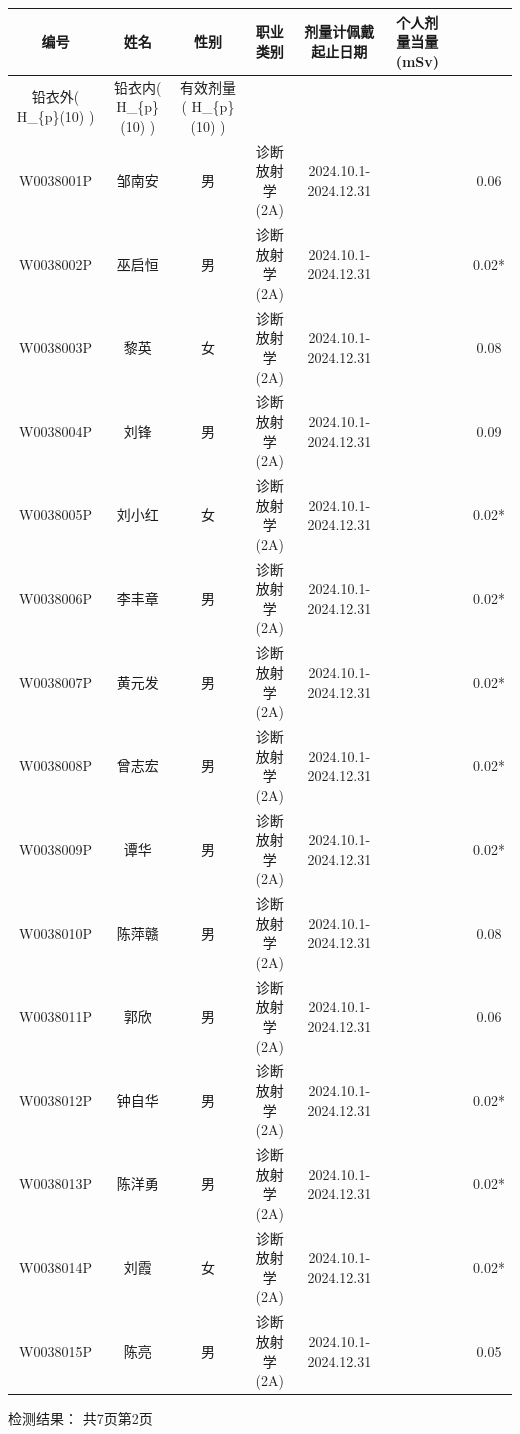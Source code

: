 \begin{table}[H]
\centering
\begin{tabular}{|c|c|c|c|c|c|c|c|}
\hline
编号 & 姓名 & 性别 & 职业类别 & 剂量计佩戴起止日期 & 个人剂量当量(mSv) &  &  \\
\hline
铅衣外( H\_\{p\}(10) ) & 铅衣内( H\_\{p\}(10) ) & 有效剂量( H\_\{p\}(10) ) &  &  &  &  &  \\
\hline
W0038001P & 邹南安 & 男 & 诊断放射学(2A) & 2024.10.1-2024.12.31 &  &  & 0.06 \\
\hline
W0038002P & 巫启恒 & 男 & 诊断放射学(2A) & 2024.10.1-2024.12.31 &  &  & 0.02* \\
\hline
W0038003P & 黎英 & 女 & 诊断放射学(2A) & 2024.10.1-2024.12.31 &  &  & 0.08 \\
\hline
W0038004P & 刘锋 & 男 & 诊断放射学(2A) & 2024.10.1-2024.12.31 &  &  & 0.09 \\
\hline
W0038005P & 刘小红 & 女 & 诊断放射学(2A) & 2024.10.1-2024.12.31 &  &  & 0.02* \\
\hline
W0038006P & 李丰章 & 男 & 诊断放射学(2A) & 2024.10.1-2024.12.31 &  &  & 0.02* \\
\hline
W0038007P & 黄元发 & 男 & 诊断放射学(2A) & 2024.10.1-2024.12.31 &  &  & 0.02* \\
\hline
W0038008P & 曾志宏 & 男 & 诊断放射学(2A) & 2024.10.1-2024.12.31 &  &  & 0.02* \\
\hline
W0038009P & 谭华 & 男 & 诊断放射学(2A) & 2024.10.1-2024.12.31 &  &  & 0.02* \\
\hline
W0038010P & 陈萍赣 & 男 & 诊断放射学(2A) & 2024.10.1-2024.12.31 &  &  & 0.08 \\
\hline
W0038011P & 郭欣 & 男 & 诊断放射学(2A) & 2024.10.1-2024.12.31 &  &  & 0.06 \\
\hline
W0038012P & 钟自华 & 男 & 诊断放射学(2A) & 2024.10.1-2024.12.31 &  &  & 0.02* \\
\hline
W0038013P & 陈洋勇 & 男 & 诊断放射学(2A) & 2024.10.1-2024.12.31 &  &  & 0.02* \\
\hline
W0038014P & 刘霞 & 女 & 诊断放射学(2A) & 2024.10.1-2024.12.31 &  &  & 0.02* \\
\hline
W0038015P & 陈亮 & 男 & 诊断放射学(2A) & 2024.10.1-2024.12.31 &  &  & 0.05 \\
\hline
\end{tabular}
\end{table}


检测结果：
共7页第2页


